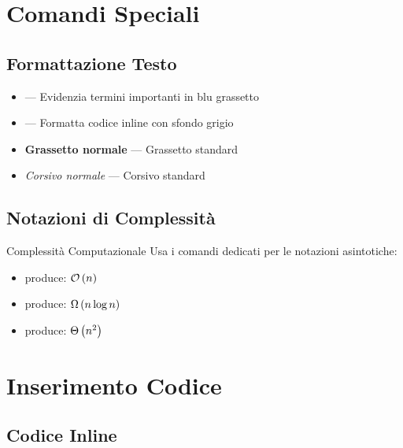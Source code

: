 \documentclass{csnotes}
\begin{document}
\section{Comandi Speciali}

\subsection{Formattazione Testo}

\begin{itemize}
    \item {} --- Evidenzia termini importanti in blu grassetto
    \item {} --- Formatta codice inline con sfondo grigio
    \item \textbf{Grassetto normale} --- Grassetto standard
    \item \textit{Corsivo normale} --- Corsivo standard
\end{itemize}

\subsection{Notazioni di Complessità}

\begin{example}{Complessità Computazionale}
Usa i comandi dedicati per le notazioni asintotiche:
\begin{itemize}
    \item {} produce: \(\mathcal{O}\left(n\right)\)
    \item {} produce: \(\Omega\left(n \log n\right)\)
    \item {} produce: \(\Theta\left(n^2\right)\)
\end{itemize}
\end{example}


\section{Inserimento Codice}

\subsection{Codice Inline}
\end{document}
